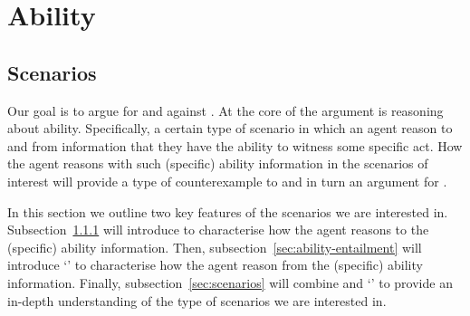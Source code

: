 \chapter{Ability}
\label{sec:major-argument}
\label{sec:broad-argum-overv}
\label{sec:all-about-ability}

\section{Scenarios}
\label{sec:cases-interest}

Our goal is to argue for \EAS{} and against \ESU{}.
At the core of the argument is reasoning about ability.
Specifically, a certain type of scenario in which an agent reason to and from information that they have the ability to witness some specific act.
How the agent reasons with such (specific) ability information in the scenarios of interest will provide a type of counterexample to \ESU{} and in turn an argument for \EAS{}.

In this section we outline two key features of the scenarios we are interested in.
Subsection~\ref{sec:type-scenario} will introduce  to characterise how the agent reasons to the (specific) ability information.
Then, subsection~\ref{sec:ability-entailment} will introduce `' to characterise how the agent reason from the (specific) ability information.
Finally, subsection~\ref{sec:scenarios} will combine  and `' to provide an in-depth understanding of the type of scenarios we are interested in.

\subsection{}
\label{sec:type-scenario}

